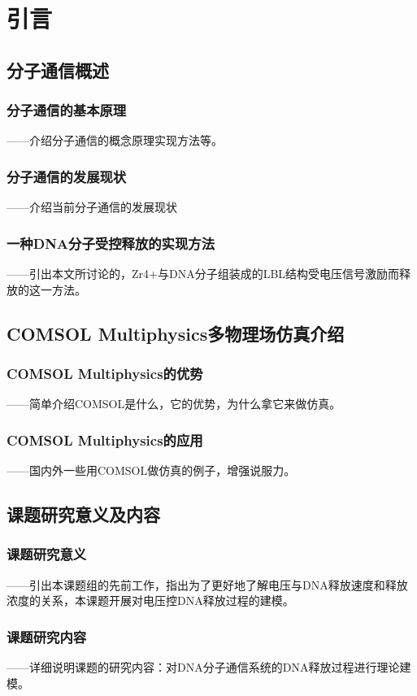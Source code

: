 \chapter{引言}

\section{分子通信概述}
\subsection{分子通信的基本原理}
——介绍分子通信的概念原理实现方法等。
\subsection{分子通信的发展现状}
——介绍当前分子通信的发展现状
\subsection{一种DNA分子受控释放的实现方法}
——引出本文所讨论的，Zr4+与DNA分子组装成的LBL结构受电压信号激励而释放的这一方法。

\section{COMSOL Multiphysics多物理场仿真介绍}
\subsection{COMSOL Multiphysics的优势}
——简单介绍COMSOL是什么，它的优势，为什么拿它来做仿真。
\subsection{COMSOL Multiphysics的应用}
——国内外一些用COMSOL做仿真的例子，增强说服力。

\section{课题研究意义及内容}
\subsection{课题研究意义}
——引出本课题组的先前工作，指出为了更好地了解电压与DNA释放速度和释放浓度的关系，本课题开展对电压控DNA释放过程的建模。
\subsection{课题研究内容}
——详细说明课题的研究内容：对DNA分子通信系统的DNA释放过程进行理论建模。

